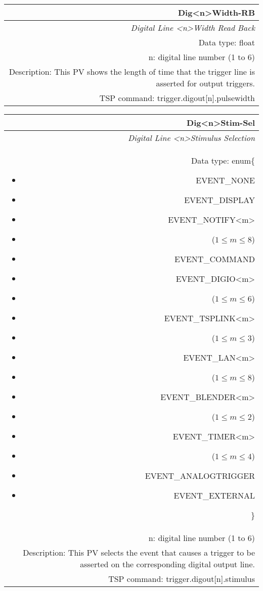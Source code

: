 \documentclass[openany]{article}
\begin{document}
		\begin{tabular}{N}
			\hline
			\bfseries Dig{\textless n\textgreater}Width-RB\label{pv:digwidth-rb} \\ \hline
			\emph{Digital Line \textless n\textgreater Width Read Back} \\
			Data type: float \\
			n: digital line number (1 to 6) \\
			Description: This PV shows the length of time that the trigger line is asserted for output triggers. \\
			TSP command: trigger.digout[n].pulsewidth
		\end{tabular}

		\begin{tabular}{N}
			\hline
			\bfseries Dig{\textless n\textgreater}Stim-Sel\label{pv:digstim-sel} \\ \hline
			\emph{Digital Line \textless n\textgreater Stimulus Selection} \\
			Data type: enum\{\begin{itemize}[noitemsep]
				\small
				\item[] EVENT\_NONE
				\item[] EVENT\_DISPLAY
				\item[] EVENT\_NOTIFY\textless m\textgreater
				\item[] ($1\leq m\leq 8$)
				\item[] EVENT\_COMMAND
				\item[] EVENT\_DIGIO\textless m\textgreater
				\item[] ($1\leq m\leq 6$)
				\item[] EVENT\_TSPLINK\textless m\textgreater
				\item[] ($1\leq m\leq 3$)
				\item[] EVENT\_LAN\textless m\textgreater
				\item[] ($1\leq m\leq 8$)
				\item[] EVENT\_BLENDER\textless m\textgreater 
				\item[] ($1\leq m\leq 2$)
				\item[] EVENT\_TIMER\textless m\textgreater
				\item[] ($1\leq m\leq 4$)
				\item[] EVENT\_ANALOGTRIGGER
				\item[] EVENT\_EXTERNAL
			\end{itemize}\} \\
			n: digital line number (1 to 6) \\
			Description: This PV selects the event that causes a trigger to be asserted on the corresponding digital output line. \\
			TSP command: trigger.digout[n].stimulus
		\end{tabular}
\end{document}
